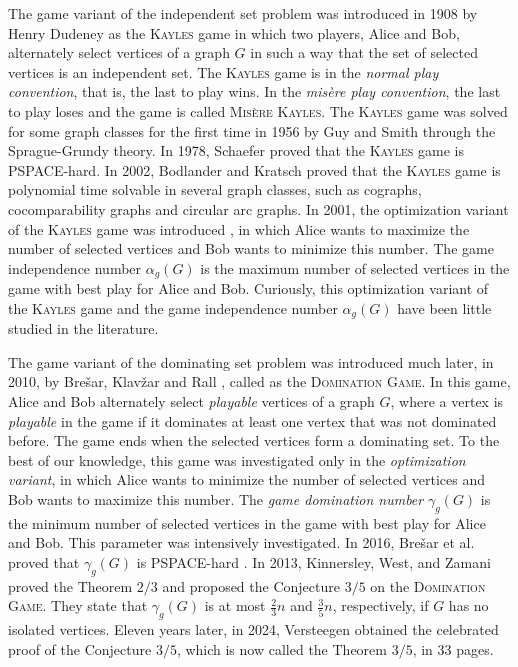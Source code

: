 \documentclass[12pt]{article}
\begin{document}
The game variant of the independent set problem was introduced in 1908 by Henry Dudeney \cite{dudeney-1917} as the \textsc{Kayles} game in which two players, Alice and Bob, alternately select vertices of a graph $G$ in such a way that the set of selected vertices is an independent set.
The \textsc{Kayles} game is in the \emph{normal play convention}, that is, the last to play wins.
In the \emph{misère play convention}, the last to play loses and the game is called \textsc{Misère Kayles}.
The \textsc{Kayles} game was solved for some graph classes for the first time in 1956 by Guy and Smith \cite{guy56} through the Sprague-Grundy theory.
In 1978, Schaefer \cite{schaefer-1978} proved that the \textsc{Kayles} game is PSPACE-hard.
In 2002, Bodlander and Kratsch \cite{bodlaender02} proved that the \textsc{Kayles} game is polynomial time solvable in several graph classes, such as cographs, cocomparability graphs and circular arc graphs.
In 2001, the optimization variant of the \textsc{Kayles} game was introduced \cite{slater01}, in which Alice wants to maximize the number of selected vertices and Bob wants to minimize this number. The game independence number $\alpha_g(G)$ is the maximum number of selected vertices in the game with best play for Alice and Bob. Curiously, this optimization variant of the \textsc{Kayles} game and the game independence number $\alpha_g(G)$ have been little studied in the literature.

The game variant of the dominating set problem was introduced much later, in 2010, by Bre\v{s}ar, Klav\v{z}ar and Rall \cite{bresar10}, called as the \textsc{Domination Game}. In this game, Alice and Bob alternately select \emph{playable} vertices of a graph $G$, where a vertex is \emph{playable} in the game if it dominates at least one vertex that was not dominated before. The game ends when the selected vertices form a dominating set.
To the best of our knowledge, this game was investigated only in the \emph{optimization variant}, in which Alice wants to minimize the number of selected vertices and Bob wants to maximize this number. The \emph{game domination number} $\gamma_g(G)$ is the minimum number of selected vertices in the game with best play for Alice and Bob.
This parameter was intensively investigated.
In 2016, Brešar et al. proved that $\gamma_g(G)$ is PSPACE-hard \cite{bresar16}.
In 2013, Kinnersley, West, and Zamani \cite{west13} proved the Theorem $2/3$ and proposed the Conjecture $3/5$ on the \textsc{Domination Game}. They state that $\gamma_g(G)$ is at most $\frac{2}{3}n$ and $\frac{3}{5}n$, respectively, if $G$ has no isolated vertices.
Eleven years later, in 2024, Versteegen \cite{versteegen24} obtained the celebrated proof of the Conjecture $3/5$, which is now called the Theorem $3/5$, in 33 pages.
\end{document}

